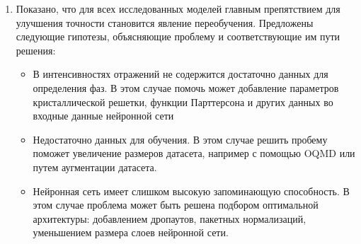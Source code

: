 \documentclass{article}
\begin{document}
\begin{enumerate}
  \item Показано, что для всех исследованных моделей главным препятствием для улучшения точности становится явление переобучения. Предложены следующие гипотезы, объясняющие проблему и соответствующие им пути решения:

    \begin{itemize}
      \item В интенсивностях отражений не содержится достаточно данных для определения фаз. В этом случае помочь может добавление параметров кристаллической решетки, функции Парттерсона и других данных во входные данные нейронной сети
      \item Недостаточно данных для обучения. В этом случае решить пробему поможет увеличение размеров датасета, например с помощью OQMD или путем аугментации датасета.
      \item Нейронная сеть имеет слишком высокую запоминающую способность. В этом случае проблема может быть решена подбором оптимальной архитектуры: добавлением дропаутов, пакетных нормализаций, уменьшением размера слоев нейронной сети.
    \end{itemize}


\end{enumerate}

\newpage
\printbibliography
\end{document}
